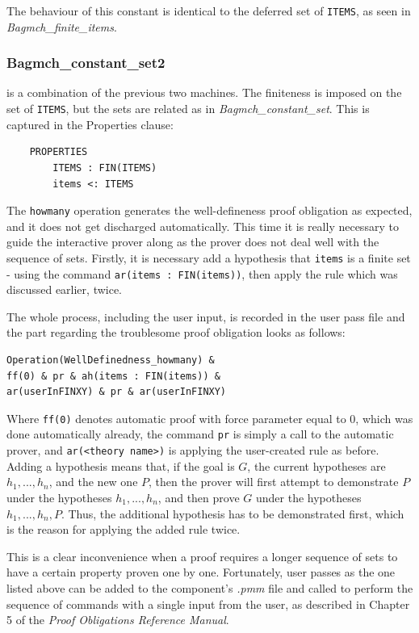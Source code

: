 \documentclass[12pt,journal,duplex]{IEEEtran}
\begin{document}
	The behaviour of this constant is identical to the deferred set of \texttt{ITEMS}, as seen in \emph{Bagmch\_finite\_items}.

	\subsubsection{Bagmch\_constant\_set2} is a combination of the previous two machines. The finiteness is imposed on the set of \texttt{ITEMS}, but the sets are related as in \emph{Bagmch\_constant\_set}. This is captured in the Properties clause:
	\begin{lstlisting}
	PROPERTIES
		ITEMS : FIN(ITEMS)
		items <: ITEMS
	\end{lstlisting}
	The \texttt{howmany} operation generates the well-defineness proof obligation as expected, and it does not get discharged automatically. This time it is really necessary to guide the interactive prover along as the prover does not deal well with the sequence of sets. Firstly, it is necessary add a hypothesis that \texttt{items} is a finite set - using the command \texttt{ar(items : FIN(items))}, then apply the rule which was discussed earlier, twice.

	The whole process, including the user input, is recorded in the user pass file and the part regarding the troublesome proof obligation looks as follows:

	\begin{lstlisting}
Operation(WellDefinedness_howmany) &
ff(0) & pr & ah(items : FIN(items)) &
ar(userInFINXY) & pr & ar(userInFINXY)
	\end{lstlisting}
	Where \texttt{ff(0)} denotes automatic proof with force parameter equal to 0, which was done automatically already, the command \texttt{pr} is simply a call to the automatic prover, and \texttt{ar(<theory name>)} is applying the user-created rule as before. Adding a hypothesis means that, if the goal is $G$, the current hypotheses are $h_1, ..., h_n$, and the new one $P$, then the prover will first attempt to demonstrate $P$ under the hypotheses $h_1, ..., h_n$, and then prove $G$ under the hypotheses $h_1, ...,h_n, P$.\cite{PO reference}  Thus, the additional hypothesis has to be demonstrated first, which is the reason for applying the added rule twice.

	This is a clear inconvenience when a proof requires a longer sequence of sets to have a certain property proven one by one. Fortunately, user passes as the one listed above can be added to the component's \emph{.pmm} file and called to perform the sequence of commands with a single input from the user, as described in Chapter 5 of the \emph{Proof Obligations Reference Manual}.
\end{document}
